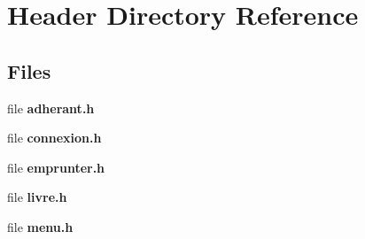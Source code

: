 \section{Header Directory Reference}
\label{dir_9791a719fed70302b85149de9ff5a60f}
\subsection*{Files}
\begin{DoxyCompactItemize}
\item 
file \textbf{ adherant.\+h}
\item 
file \textbf{ connexion.\+h}
\item 
file \textbf{ emprunter.\+h}
\item 
file \textbf{ livre.\+h}
\item 
file \textbf{ menu.\+h}
\end{DoxyCompactItemize}
